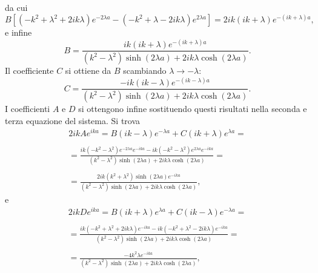 \documentclass[a4paper,11pt,oneside]{book}
\begin{document}
da cui
\begin{equation}
B\left[ (-k^2+\lambda ^2+2ik\lambda) e^{-2\lambda a }-(-k^2+\lambda-2ik\lambda) e^{2\lambda a }\right]= 2ik(ik+\lambda) e^{-\left(ik+\lambda\right) a },
\end{equation}
e infine
\begin{equation}
B=\frac{ik\left(ik+\lambda \right)e^{-\left(ik+\lambda\right) a }}{\left(k^2-\lambda^2\right)\sinh \left(2\lambda a\right)+2ik\lambda \cosh\left(2\lambda a\right)}.
\end{equation}
Il coefficiente $C$ si ottiene da $B$ scambiando $\lambda \rightarrow -\lambda$:
\begin{equation}
C=\frac{-ik\left(ik-\lambda \right)e^{-\left(ik-\lambda\right) a }}{\left(k^2-\lambda^2\right)\sinh \left(2\lambda a\right)+2ik\lambda \cosh\left(2\lambda a\right)}.
\end{equation}
I coefficienti $A$ e $D$ si ottengono infine sostituendo questi risultati nella seconda e terza equazione del sistema. Si trova
\begin{eqnarray}
& 2ikAe^{ika}= B \left(ik-\lambda\right)e^{-\lambda a} +C \left(ik+\lambda\right)e^{\lambda a}=&\nonumber \\
\nonumber\\
& = \displaystyle{\frac{ik\left(-k^2-\lambda ^2 \right)e^{-2\lambda a }e^{-ika }-ik\left(-k^2-\lambda ^2 \right)e^{2\lambda a }e^{-ika }}{\left(k^2-\lambda^2\right)\sinh \left(2\lambda a\right)+2ik\lambda \cosh\left(2\lambda a\right)}=} &\nonumber \\
\nonumber \\
&\displaystyle{ =\frac{2ik\left(k^2+\lambda ^2 \right)\sinh\left(2\lambda a\right)e^{-ika}}{\left(k^2-\lambda^2\right)\sinh \left(2\lambda a\right)+2ik\lambda \cosh\left(2\lambda a\right)}},&
\end{eqnarray}
e
\begin{eqnarray}
&2ikD e^{ika} = B\left(ik+\lambda\right)e^{\lambda a} + C\left(ik-\lambda\right)e^{-\lambda a} = &\nonumber \\
\nonumber\\
& = \displaystyle{\frac{ik\left(-k^2 + \lambda ^2 +2ik\lambda\right)e^{-ika}-ik\left(-k^2 + \lambda ^2 -2ik\lambda\right)e^{-ika}}{\left(k^2-\lambda^2\right)\sinh \left(2\lambda a\right)+2ik\lambda \cosh\left(2\lambda a\right)}=} &\nonumber \\
\nonumber \\
&\displaystyle{ =\frac{-4k^2\lambda e^{-ika}}{\left(k^2-\lambda^2\right)\sinh \left(2\lambda a\right)+2ik\lambda \cosh\left(2\lambda a\right)}},&
\end{eqnarray}
\end{document}

